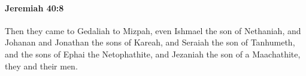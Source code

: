 
		\paragraph{Jeremiah 40:8} %
			\label{JEREMIAH-40-8}

			Then they came to Gedaliah to Mizpah, even Ishmael the son of Nethaniah, and Johanan and Jonathan the sons of Kareah, and Seraiah the son of Tanhumeth, and the sons of Ephai the Netophathite, and Jezaniah the son of a Maachathite, they and their men.


